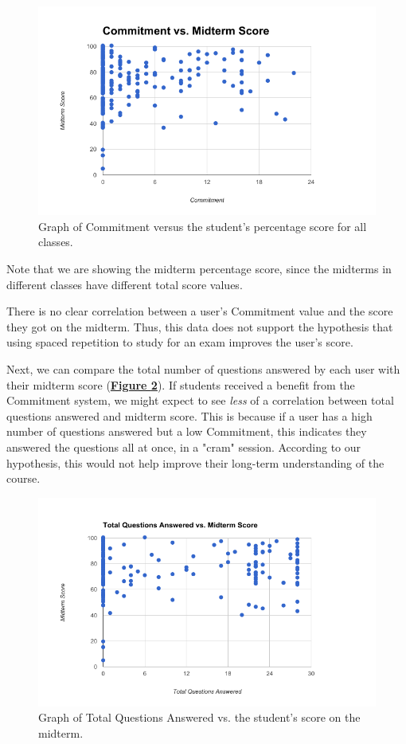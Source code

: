  \begin{figure}[ht]
 	\includegraphics[width=1.0\linewidth]{figures/commitment-data1}
 	\caption{Graph of Commitment versus the student's percentage score for all classes.}
 	\label{fig:comm_vs_score}
 \end{figure}

\par Note that we are showing the midterm percentage score, since the midterms in different classes have different total score values.
\par There is no clear correlation between a user's Commitment value and the score they got on the midterm. Thus, this data does not support the hypothesis that using spaced repetition to study for an exam improves the user's score.

\par  Next, we can compare the total number of questions answered by each user with their midterm score (\textbf{\hyperref[fig:cramming]{Figure \ref*{fig:cramming}}}). If students received a benefit from the Commitment system, we might expect to see \textit{less} of a correlation between total questions answered and midterm score. This is because if a user has a high number of questions answered but a low Commitment, this indicates they answered the questions all at once, in a "cram" session. According to our hypothesis, this would not help improve their long-term understanding of the course.

\begin{figure}[ht]
	\includegraphics[width=1.0\linewidth]{figures/cramming-data}
	\caption{Graph of Total Questions Answered vs. the student's score on the midterm.}
	\label{fig:cramming}
\end{figure}
 
